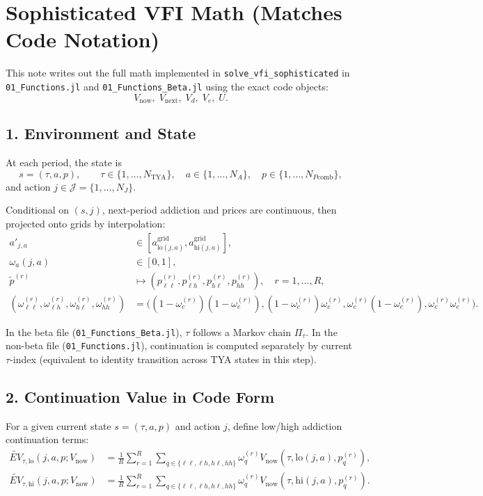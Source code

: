 \documentclass[a4paper, 11pt]{article}
\begin{document}
\section*{Sophisticated VFI Math (Matches Code Notation)}

\noindent This note writes out the full math implemented in
\texttt{solve\_vfi\_sophisticated} in
\texttt{01\_Functions.jl} and \texttt{01\_Functions\_Beta.jl}
using the exact code objects:
\[
V_{\text{now}},\; V_{\text{next}},\; V_d,\; V_e,\; U.
\]

\subsection*{1. Environment and State}

\noindent At each period, the state is
\[
s=(\tau,a,p),\qquad \tau\in\{1,\dots,N_{\text{TYA}}\},\quad a\in\{1,\dots,N_A\},\quad p\in\{1,\dots,N_{P\text{comb}}\},
\]
and action \(j\in\mathcal{J}=\{1,\dots,N_J\}\).

\noindent Conditional on \((s,j)\), next-period addiction and prices are continuous, then projected onto grids by interpolation:
\begin{align}
a'_{j,a} &\in [a^{\text{grid}}_{\text{lo}(j,a)}, a^{\text{grid}}_{\text{hi}(j,a)}], \\
\omega_a(j,a) &\in [0,1], \\
\tilde p^{(r)} &\mapsto (p_{\ell\ell}^{(r)},p_{\ell h}^{(r)},p_{h\ell}^{(r)},p_{hh}^{(r)}),\quad r=1,\dots,R,\\
(\omega_{\ell\ell}^{(r)},\omega_{\ell h}^{(r)},\omega_{h\ell}^{(r)},\omega_{hh}^{(r)}) &=
\big((1-\omega_c^{(r)})(1-\omega_e^{(r)}),(1-\omega_c^{(r)})\omega_e^{(r)},\omega_c^{(r)}(1-\omega_e^{(r)}),\omega_c^{(r)}\omega_e^{(r)}\big).
\end{align}

\noindent In the beta file (\texttt{01\_Functions\_Beta.jl}), \(\tau\) follows a Markov chain \(\Pi_{\tau}\).
In the non-beta file (\texttt{01\_Functions.jl}), continuation is computed separately by current \(\tau\)-index (equivalent to identity transition across TYA states in this step).

\subsection*{2. Continuation Value in Code Form}

\noindent For a given current state \(s=(\tau,a,p)\) and action \(j\), define low/high addiction continuation terms:
\begin{align}
\widetilde{EV}_{\tau,\text{lo}}(j,a,p;V_{\text{now}})
&= \frac{1}{R}\sum_{r=1}^R
\sum_{q\in\{\ell\ell,\ell h,h\ell,hh\}}
\omega_q^{(r)} V_{\text{now}}(\tau,\text{lo}(j,a),p_q^{(r)}),\\
\widetilde{EV}_{\tau,\text{hi}}(j,a,p;V_{\text{now}})
&= \frac{1}{R}\sum_{r=1}^R
\sum_{q\in\{\ell\ell,\ell h,h\ell,hh\}}
\omega_q^{(r)} V_{\text{now}}(\tau,\text{hi}(j,a),p_q^{(r)}).
\end{align}
\end{document}
